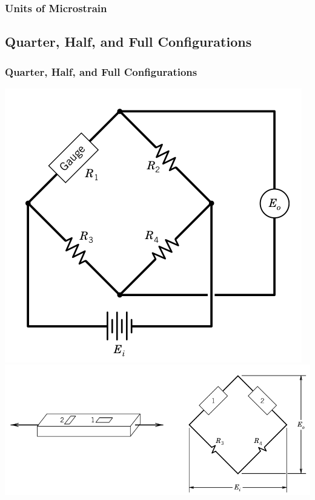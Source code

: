 \documentclass[fleqn]{beamer} %
\newcommand{\sectionIIIsubsectionItitle}{Units of Microstrain}
\newcommand{\sectionIIIsubsectionIItitle}{Quarter, Half, and Full Configurations}
\begin{document}
			\begin{frame}
				\frametitle{\sectionIIIsubsectionItitle}
		
			\end{frame}

		\subsection{\sectionIIIsubsectionIItitle}\label{sectionIIIsubsectionII}	

			\begin{frame}
				\frametitle{\sectionIIIsubsectionIItitle}

				\bigskip

				\includegraphics[scale=.2]{images/gauge_in_bridge_quarter.png} 
				\includegraphics[scale=.2]{images/gauge_in_bridge_half.png} 

\end{frame}
\end{document}

